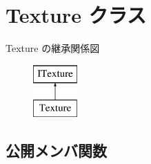 \hypertarget{class_a_p_i_1_1_texture}{}\section{Texture クラス}
\label{class_a_p_i_1_1_texture}
Texture の継承関係図\begin{figure}[H]
\begin{center}
\leavevmode
\includegraphics[height=2.000000cm]{class_a_p_i_1_1_texture}
\end{center}
\end{figure}
\subsection*{公開メンバ関数}
